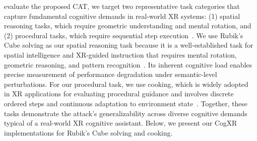 \documentclass[sigconf,review,anonymous]{acmart}
\begin{document}
evaluate the proposed  CAT, we target two representative task categories that capture fundamental cognitive demands in real-world XR systems: (1) spatial reasoning tasks, which require geometric understanding and mental rotation, and (2) procedural tasks, which require sequential step execution~\cite{rochlen2023sequential,li2025enhancing}. We use Rubik's Cube solving as our spatial reasoning task because it is a well-established task for spatial intelligence and XR-guided instruction that requires mental rotation, geometric reasoning, and pattern recognition~\cite{ren2025rubikon,valerie2020supporting, hajahmadi2024investigating}. Its inherent cognitive load enables precise measurement of performance degradation under semantic-level perturbations. For our procedural task, we use cooking, which is widely adopted in XR applications for evaluating procedural guidance and involves discrete ordered steps and continuous adaptation to environment state~\cite{qorbani2025teaching, majil2022augmented, ghasemi2023embedding, bonnetto2025epfl}. Together, these tasks demonstrate the attack’s generalizability across diverse cognitive demands typical of a real-world XR cognitive assistant. Below, we present our CogXR implementations for Rubik’s Cube solving and cooking.



\end{document}
